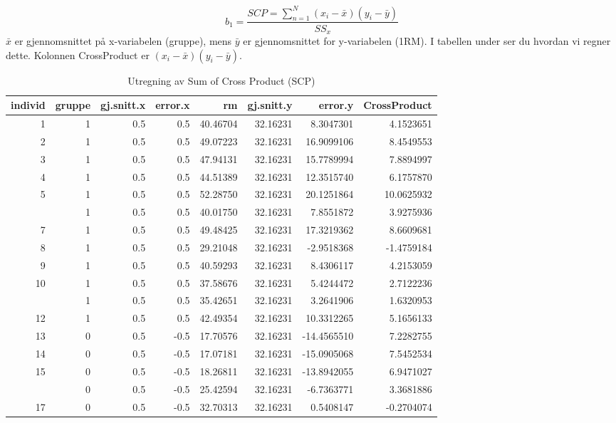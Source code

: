 \documentclass[
]{book}
\begin{document}
\[ b_1 = \frac{SCP = \sum_{n=1}^N (x_i - \bar{x})(y_i - \bar{y})}{SS_x} \]
\(\bar{x}\) er gjennomsnittet på x-variabelen (gruppe), mens \(\bar{y}\) er gjennomsnittet for y-variabelen (1RM). I tabellen under ser du hvordan vi regner dette. Kolonnen CrossProduct er \((x_i - \bar{x})(y_i - \bar{y})\).

\begin{table}

\caption{\label{tab:unnamed-chunk-2}Utregning av Sum of Cross Product (SCP)}
\centering
\begin{tabular}[t]{rrrrrrrr}
\toprule
individ & gruppe & gj.snitt.x & error.x & rm & gj.snitt.y & error.y & CrossProduct\\
\midrule
1 & 1 & 0.5 & 0.5 & 40.46704 & 32.16231 & 8.3047301 & 4.1523651\\
2 & 1 & 0.5 & 0.5 & 49.07223 & 32.16231 & 16.9099106 & 8.4549553\\
3 & 1 & 0.5 & 0.5 & 47.94131 & 32.16231 & 15.7789994 & 7.8894997\\
4 & 1 & 0.5 & 0.5 & 44.51389 & 32.16231 & 12.3515740 & 6.1757870\\
5 & 1 & 0.5 & 0.5 & 52.28750 & 32.16231 & 20.1251864 & 10.0625932\\
\addlinespace
6 & 1 & 0.5 & 0.5 & 40.01750 & 32.16231 & 7.8551872 & 3.9275936\\
7 & 1 & 0.5 & 0.5 & 49.48425 & 32.16231 & 17.3219362 & 8.6609681\\
8 & 1 & 0.5 & 0.5 & 29.21048 & 32.16231 & -2.9518368 & -1.4759184\\
9 & 1 & 0.5 & 0.5 & 40.59293 & 32.16231 & 8.4306117 & 4.2153059\\
10 & 1 & 0.5 & 0.5 & 37.58676 & 32.16231 & 5.4244472 & 2.7122236\\
\addlinespace
11 & 1 & 0.5 & 0.5 & 35.42651 & 32.16231 & 3.2641906 & 1.6320953\\
12 & 1 & 0.5 & 0.5 & 42.49354 & 32.16231 & 10.3312265 & 5.1656133\\
13 & 0 & 0.5 & -0.5 & 17.70576 & 32.16231 & -14.4565510 & 7.2282755\\
14 & 0 & 0.5 & -0.5 & 17.07181 & 32.16231 & -15.0905068 & 7.5452534\\
15 & 0 & 0.5 & -0.5 & 18.26811 & 32.16231 & -13.8942055 & 6.9471027\\
\addlinespace
16 & 0 & 0.5 & -0.5 & 25.42594 & 32.16231 & -6.7363771 & 3.3681886\\
17 & 0 & 0.5 & -0.5 & 32.70313 & 32.16231 & 0.5408147 & -0.2704074\\

\end{tabular}
\end{table}
\end{document}
